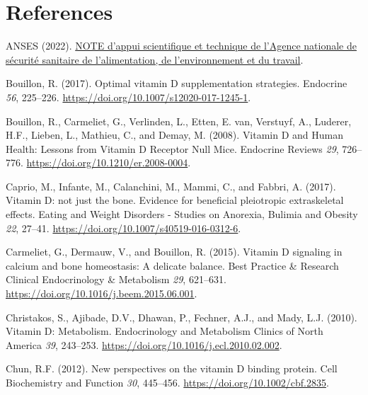 \documentclass[
  letterpaper,
  DIV=11,
  numbers=noendperiod]{scrartcl}
\newlength{\cslhangindent}
\newlength{\cslentryspacingunit} %
\newenvironment{CSLReferences}[2] %
 {%
  \setlength{\parindent}{0pt}
  \ifodd #1
  \let\oldpar\par
  \def\par{\hangindent=\cslhangindent\oldpar}
  \fi
  \setlength{\parskip}{#2\cslentryspacingunit}
 }%
 {}
\begin{document}
\newpage{}

\hypertarget{references}{%
\section*{References}\label{references}}

\hypertarget{refs}{}
\begin{CSLReferences}{0}{0}
\leavevmode{}%
ANSES (2022).
\href{https://www.anses.fr/fr/system/files/NUT2022AST0099.pdf}{{NOTE
d'appui scientifique et technique de l'Agence nationale de sécurité
sanitaire de l'alimentation, de l'environnement et du travail}}.

\leavevmode{}%
Bouillon, R. (2017). {Optimal vitamin D supplementation strategies}.
Endocrine \emph{56}, 225--226.
\url{https://doi.org/10.1007/s12020-017-1245-1}.

\leavevmode{}%
Bouillon, R., Carmeliet, G., Verlinden, L., Etten, E. van, Verstuyf, A.,
Luderer, H.F., Lieben, L., Mathieu, C., and Demay, M. (2008). {Vitamin D
and Human Health: Lessons from Vitamin D Receptor Null Mice}. Endocrine
Reviews \emph{29}, 726--776. \url{https://doi.org/10.1210/er.2008-0004}.

\leavevmode{}%
Caprio, M., Infante, M., Calanchini, M., Mammi, C., and Fabbri, A.
(2017). {Vitamin D: not just the bone. Evidence for beneficial
pleiotropic extraskeletal effects}. Eating and Weight Disorders -
Studies on Anorexia, Bulimia and Obesity \emph{22}, 27--41.
\url{https://doi.org/10.1007/s40519-016-0312-6}.

\leavevmode{}%
Carmeliet, G., Dermauw, V., and Bouillon, R. (2015). {Vitamin D
signaling in calcium and bone homeostasis: A delicate balance}. Best
Practice \& Research Clinical Endocrinology \& Metabolism \emph{29},
621--631. \url{https://doi.org/10.1016/j.beem.2015.06.001}.

\leavevmode{}%
Christakos, S., Ajibade, D.V., Dhawan, P., Fechner, A.J., and Mady, L.J.
(2010). {Vitamin D: Metabolism}. Endocrinology and Metabolism Clinics of
North America \emph{39}, 243--253.
\url{https://doi.org/10.1016/j.ecl.2010.02.002}.

\leavevmode{}%
Chun, R.F. (2012). {New perspectives on the vitamin D binding protein}.
Cell Biochemistry and Function \emph{30}, 445--456.
\url{https://doi.org/10.1002/cbf.2835}.


\end{CSLReferences}
\end{document}
